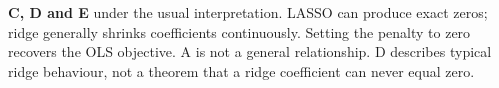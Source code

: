 \textbf{C, D and E} under the usual interpretation. LASSO can produce exact zeros; ridge generally shrinks coefficients continuously. Setting the penalty to zero recovers the OLS objective. A is not a general relationship. D describes typical ridge behaviour, not a theorem that a ridge coefficient can never equal zero.
